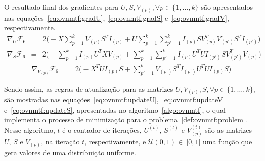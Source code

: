 \documentclass[
    12pt,                %
    oneside,            %
    a4paper,            %
    english,            %
    brazil                %
    ]{abntex2ppgsi}
\begin{document}
O resultado final dos gradientes para $U, S, V_{(p)}, \forall p \in \{1, \dots, k\}$ são apresentados nas equações~\ref{eq:ovnmtf:gradU},~\ref{eq:ovnmtf:gradS} e~\ref{eq:ovnmtf:gradV}, respectivamente.
\begin{equation}
\label{eq:ovnmtf:gradU}
    \begin{array}{lcl}
        \nabla_U \mathcal{F}_6 & = & 2 \big( - X \sum_{p=1}^{k} V_{(p)} S^T I_{(p)} + U \sum_{p=1}^k \sum_{p'=1}^{k} I_{(p)} S V_{(p)}^T V_{(p')} S^T I_{(p')} \big)
    \end{array}
\end{equation}
\begin{equation}
\label{eq:ovnmtf:gradS}
    \begin{array}{lcl}
        \nabla_S \mathcal{F}_6 & = & 2 \big( - \sum_{p=1}^{k} I_{(p)} U^T X V_{(p)} + \sum_{p=1}^{k} \sum_{p'=1}^{k} I_{(p)} U^T U I_{(p')} S V_{(p')}^T V_{(p)} \big)
    \end{array}
\end{equation}
\begin{equation}
\label{eq:ovnmtf:gradV}
    \begin{array}{lcl}
        \nabla_{V_{(p)}} \mathcal{F}_6 & = & 2 \big( -X^T U I_{(p)} S + \sum_{p'=1}^{k} V_{(p')} S^T I_{(p')} U^T U I_{(p)} S \big)
    \end{array}
\end{equation}

Sendo assim, as regras de atualização para as matrizes $U, V_{(p)}, S, \forall p \in \{1, \dots, k\}$, são mostradas nas equações~\ref{eq:ovnmtf:updateU},~\ref{eq:ovnmtf:updateV} e~\ref{eq:ovnmtf:updateS}, apresentadas no algoritmo~\ref{algo:ovnmtf}, o qual implementa o processo de minimização para o problema~\ref{def:ovnmtf:problem}.
Nesse algoritmo, $t$ é o contador de iterações, $U^{(t)}$, $S^{(t)}$ e $V_{(p)}^{(t)}$ são as matrizes $U$, $S$ e $V_{(p)}$, na iteração $t$, respectivamente, e $\mathcal{U}(0, 1) \in~]0, 1]$ uma função que gera valores de uma distribuição uniforme.

\end{document}
